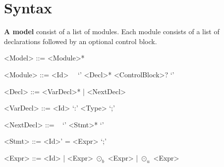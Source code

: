 \chapter{Syntax}

\newcommand{\paratitle}[1]{\textsf{\textbf{#1}}}
\newcommand{\nonterminal}[1]{$\langle \textit{#1} \rangle$}
\newcommand{\primesymbol}{\textsf{'}}
\newcommand{\binop}{\ensuremath{\odot_b}}
\newcommand{\unop}{\ensuremath{\odot_u}}

\setlength{\grammarindent}{12em} %

\paratitle{A model} consist of a list of modules. Each module consists of a list of declarations followed by an optional control block.
\begin{grammar}
     <Model> ::= <Module>*

     <Module> ::=  <Id>~~ `{' <Decl>* <ControlBlock>? `}'

     <Decl> ::= <VarDecl>* | <NextDecl>

     <VarDecl> ::=  <Id> `:' <Type> `;'

     <NextDecl> ::=  ~ `{' <Stmt>* `}'

     <Stmt> ::= <Id>\primesymbol{} = <Expr> `;'

     <Expr> ::= <Id> | <Expr> \binop{} <Expr> | \unop{} <Expr>
\end{grammar}

